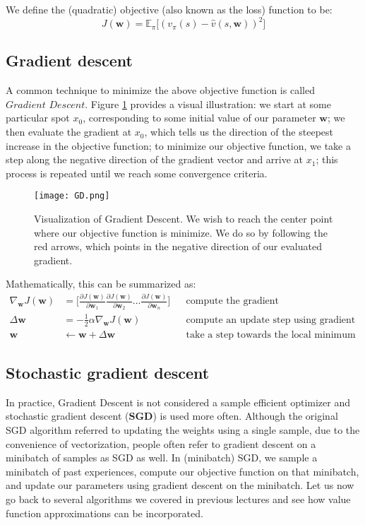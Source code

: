 \documentclass{article}
\newcommand{\E}{\mathbb{E}}                                        %
\newcommand{\w}{\mathbf{w}}
\begin{document}
We define the (quadratic) objective (also known as the loss) function to be:
\begin{equation*}
J(\w) = \E_{\pi} \Big[ (v_{\pi} (s) - \hat{v} (s,\w) )^2 \Big]
\end{equation*}

\subsection{Gradient descent}

A common technique to minimize the above objective function is called $\textit{Gradient Descent}$. Figure \ref{fig:gd} provides a visual illustration: we start at some particular spot $x_0$, corresponding to some initial value of our parameter $\w$; we then evaluate the gradient at $x_0$, which tells us the direction of the steepest increase in the objective function; to minimize our objective function, we take a step along the negative direction of the gradient vector and arrive at $x_1$; this process is repeated until we reach some convergence criteria.

\begin{figure}
    \centering
    \texttt{[image: GD.png]}
    \caption{Visualization of Gradient Descent. We wish to reach the center point where our objective function is minimize. We do so by following the red arrows, which points in the negative direction of our evaluated gradient.}
    \label{fig:gd}
\end{figure}

Mathematically, this can be summarized as:
\begin{align*}
	\nabla_{\w} J(\w) & = \Bigg[ \frac{\partial J(\w)}{\partial \w_1} \frac{\partial J(\w)}{\partial \w_2} \dots \frac{\partial J(\w)}{\partial \w_n} \Bigg] && \text{compute the gradient} \\
	\Delta \w & = - \frac{1}{2} \alpha \nabla_{\w} J(\w) && \text{compute an update step using gradient descent} \\
	\w & \gets \w + \Delta \w && \text{take a step towards the local minimum}
\end{align*}

\subsection{Stochastic gradient descent}

In practice, Gradient Descent is not considered a sample efficient optimizer and stochastic gradient descent ($\mathbf{SGD}$) is used more often. Although the original SGD algorithm referred to updating the weights using a single sample, due to the convenience of vectorization, people often refer to gradient descent on a minibatch of samples as SGD as well. In (minibatch) SGD, we sample a minibatch of past experiences, compute our objective function on that minibatch, and update our parameters using gradient descent on the minibatch. Let us now go back to several algorithms we covered in previous lectures and see how value function approximations can be incorporated.
\end{document}
